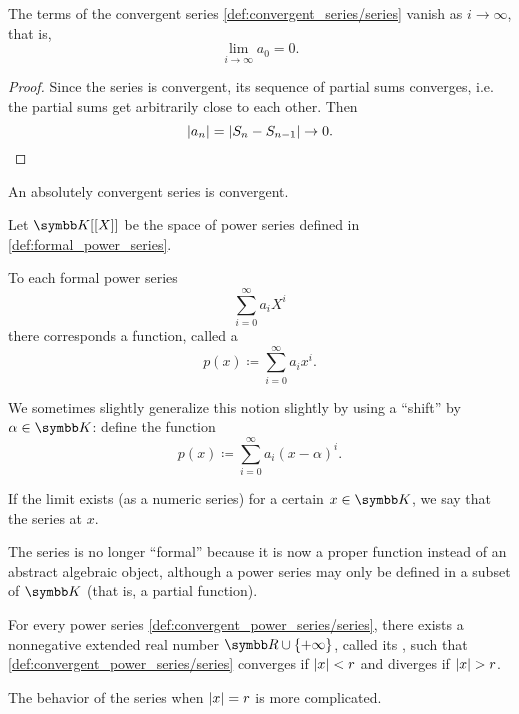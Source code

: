 \begin{proposition}\label{thm:convergent_series_terms_vanish}
  The terms of the convergent series \cref{def:convergent_series/series} vanish as \( i \to \infty \), that is,
  \begin{equation*}
    \lim_{i \to \infty} a_0 = 0.
  \end{equation*}
\end{proposition}
\begin{proof}
  Since the series is convergent, its sequence of partial sums converges, i.e. the partial sums get arbitrarily close to each other. Then
  \begin{equation*}
    \left\vert a_n \right\vert = \left\vert S_n - S_{n-1} \right\vert \to 0.
  \end{equation*}
\end{proof}

\begin{proposition}\label{thm:absolutely_convergent_series_is_convergent}
  An absolutely convergent series is convergent.
\end{proposition}

\begin{definition}\label{def:convergent_power_series}
  Let \( \K[[X]] \) be the space of power series defined in \cref{def:formal_power_series}.

  To each formal power series
  \begin{equation*}
    \sum_{i=0}^\infty a_i X^i
  \end{equation*}
  there corresponds a function, called a 
  \begin{equation}\label{def:convergent_power_series/series}
    p(x) \coloneqq \sum_{i=0}^\infty a_i x^i.
  \end{equation}

  We sometimes slightly generalize this notion slightly by using a \enquote{shift} by \( \alpha \in \K \): define the function
  \begin{equation}\label{def:convergent_power_series/shifted_series}
    p(x) \coloneqq \sum_{i=0}^\infty a_i (x - \alpha)^i.
  \end{equation}

  If the limit exists (as a numeric series) for a certain \( x \in \K \), we say that the series  at \( x \).

  The series is no longer \enquote{formal} because it is now a proper function instead of an abstract algebraic object, although a power series may only be defined in a subset of \( \K \) (that is, a partial function).
\end{definition}

\begin{theorem}\label{thm:power_series_radius_of_convergence}
  For every power series \cref{def:convergent_power_series/series}, there exists a nonnegative extended real number \( \R \cup \{ +\infty \} \), called its , such that \cref{def:convergent_power_series/series} converges if \( \left\vert x \right\vert < r \) and diverges if \( \left\vert x \right\vert > r \).

  The behavior of the series when \( \left\vert x \right\vert = r \) is more complicated.
\end{theorem}
